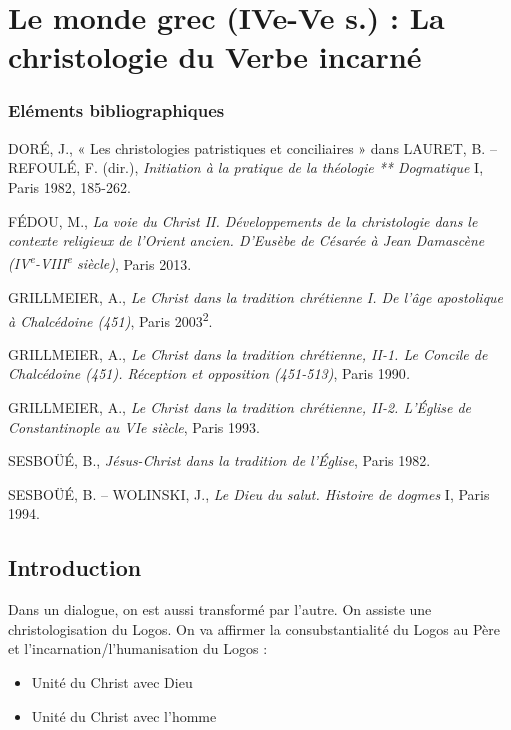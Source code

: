 

\chapter{Le monde grec (IVe-Ve s.) :
La christologie du Verbe incarné}




\subsection{Eléments bibliographiques}

DORÉ, J., « Les christologies patristiques et conciliaires » dans
LAURET, B. -- REFOULÉ, F. (dir.), \emph{Initiation à la pratique de la
théologie ** Dogmatique} I, Paris 1982, 185-262.

FÉDOU, M., \emph{La voie du Christ II. Développements de la christologie
dans le contexte religieux de l'Orient ancien. D'Eusèbe de Césarée à
Jean Damascène (IV\textsuperscript{e}-VIII\textsuperscript{e} siècle)},
Paris 2013.

GRILLMEIER, A., \emph{Le Christ dans la tradition chrétienne I. De l'âge
apostolique à Chalcédoine (451)}, Paris 2003\textsuperscript{2}.

GRILLMEIER, A., \emph{Le Christ dans la tradition chrétienne, II-1. Le
Concile de Chalcédoine (451). Réception et opposition (451-513)}, Paris
1990\emph{.}

GRILLMEIER, A., \emph{Le Christ dans la tradition chrétienne, II-2.
L'Église de Constantinople au VIe siècle}, Paris 1993.

SESBOÜÉ, B., \emph{Jésus-Christ dans la tradition de l'Église}, Paris
1982.

SESBOÜÉ, B. -- WOLINSKI, J., \emph{Le Dieu du salut. Histoire de dogmes}
I, Paris 1994.


\hypertarget{introduction}{%
\section{Introduction}\label{introduction}}

Dans un dialogue, on est aussi transformé par l'autre. On assiste une christologisation du Logos.
On va affirmer la consubstantialité du Logos au Père et l'incarnation/l'humanisation du Logos :
\begin{itemize}
    \item Unité du Christ avec Dieu
    \item Unité du Christ avec l'homme
\end{itemize}

